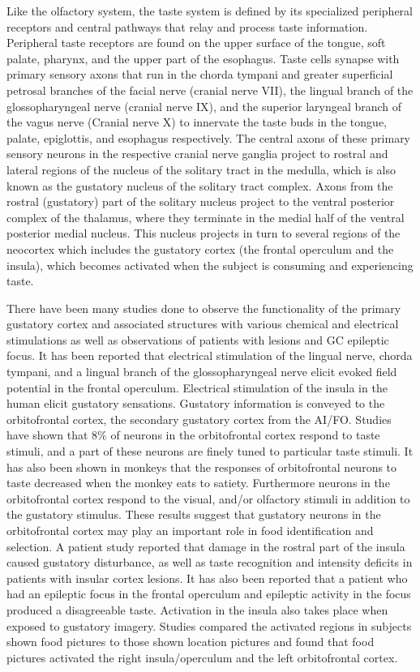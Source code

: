 Like the olfactory system, the taste system is defined by its specialized peripheral receptors and central pathways that relay and process taste information. Peripheral taste receptors are found on the upper surface of the tongue, soft palate, pharynx, and the upper part of the esophagus. Taste cells synapse with primary sensory axons that run in the chorda tympani and greater superficial petrosal branches of the facial nerve (cranial nerve VII), the lingual branch of the glossopharyngeal nerve (cranial nerve IX), and the superior laryngeal branch of the vagus nerve (Cranial nerve X) to innervate the taste buds in the tongue, palate, epiglottis, and esophagus respectively. The central axons of these primary sensory neurons in the respective cranial nerve ganglia project to rostral and lateral regions of the nucleus of the solitary tract in the medulla, which is also known as the gustatory nucleus of the solitary tract complex. Axons from the rostral (gustatory) part of the solitary nucleus project to the ventral posterior complex of the thalamus, where they terminate in the medial half of the ventral posterior medial nucleus. This nucleus projects in turn to several regions of the neocortex which includes the gustatory cortex (the frontal operculum and the insula), which becomes activated when the subject is consuming and experiencing taste.

There have been many studies done to observe the functionality of the primary gustatory cortex and associated structures with various chemical and electrical stimulations as well as observations of patients with lesions and GC epileptic focus. It has been reported that electrical stimulation of the lingual nerve, chorda tympani, and a lingual branch of the glossopharyngeal nerve elicit evoked field potential in the frontal operculum. Electrical stimulation of the insula in the human elicit gustatory sensations. Gustatory information is conveyed to the orbitofrontal cortex, the secondary gustatory cortex from the AI/FO. Studies have shown that 8\% of neurons in the orbitofrontal cortex respond to taste stimuli, and a part of these neurons are finely tuned to particular taste stimuli. It has also been shown in monkeys that the responses of orbitofrontal neurons to taste decreased when the monkey eats to satiety. Furthermore neurons in the orbitofrontal cortex respond to the visual, and/or olfactory stimuli in addition to the gustatory stimulus. These results suggest that gustatory neurons in the orbitofrontal cortex may play an important role in food identification and selection. A patient study reported that damage in the rostral part of the insula caused gustatory disturbance, as well as taste recognition and intensity deficits in patients with insular cortex lesions. It has also been reported that a patient who had an epileptic focus in the frontal operculum and epileptic activity in the focus produced a disagreeable taste. Activation in the insula also takes place when exposed to gustatory imagery. Studies compared the activated regions in subjects shown food pictures to those shown location pictures and found that food pictures activated the right insula/operculum and the left orbitofrontal cortex.

